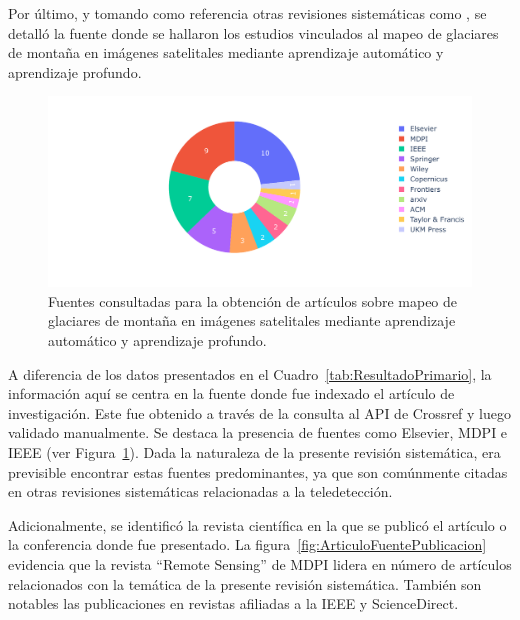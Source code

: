 Por último, y tomando como referencia otras revisiones sistemáticas como , se detalló la fuente donde se hallaron los estudios vinculados al mapeo de glaciares de montaña en imágenes satelitales mediante aprendizaje automático y aprendizaje profundo.

\begin{figure}[H]
    \begin{center}
    \includegraphics[width=1\textwidth]{Images/ArticuloFuente.pdf}
    \end{center}
    \caption{Fuentes consultadas para la obtención de artículos sobre mapeo de glaciares de montaña en imágenes satelitales mediante aprendizaje automático y aprendizaje profundo.}
     \label{fig:ArticuloFuente}
\end{figure}

A diferencia de los datos presentados en el Cuadro~\ref{tab:ResultadoPrimario}, la información aquí se centra en la fuente donde fue indexado el artículo de investigación. Este fue obtenido a través de la consulta al API de Crossref y luego validado manualmente. Se destaca la presencia de fuentes como Elsevier, MDPI e IEEE (ver Figura~\ref{fig:ArticuloFuente}). Dada la naturaleza de la presente revisión sistemática, era previsible encontrar estas fuentes predominantes, ya que son comúnmente citadas en otras revisiones sistemáticas relacionadas a la teledetección. %

Adicionalmente, se identificó la revista científica en la que se publicó el artículo o la conferencia donde fue presentado. La figura~\ref{fig:ArticuloFuentePublicacion} evidencia que la revista ``Remote Sensing'' de MDPI lidera en número de artículos relacionados con la temática de la presente revisión sistemática. También son notables las publicaciones en revistas afiliadas a la IEEE y ScienceDirect.
 
